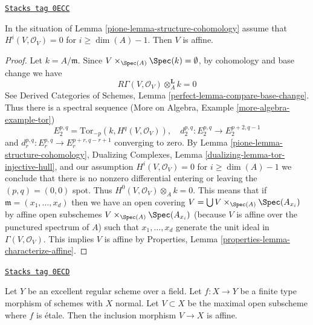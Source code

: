 \begin{lemma}[Conclude]
\label{pione-lemma-conclude}
\href{https://stacks.math.columbia.edu/tag/0ECC}{\texttt{Stacks tag 0ECC}}

In the situation of Lemma \ref{pione-lemma-structure-cohomology}
assume that $H^i(V, \mathcal{O}_V) = 0$ for $i \geq \dim(A) - 1$.
Then $V$ is affine.
\end{lemma}

\begin{proof}

Let $k = A/\mathfrak m$. Since $V \times_{\Spec(A)} \Spec(k) = \emptyset$,
by cohomology and base change we have
$$
R\Gamma(V, \mathcal{O}_V) \otimes_A^\mathbf{L} k = 0
$$
See
Derived Categories of Schemes, Lemma \ref{perfect-lemma-compare-base-change}.
Thus there is a spectral sequence
(More on Algebra, Example \ref{more-algebra-example-tor})
$$
E_2^{p, q} = \text{Tor}_{-p}(k, H^q(V, \mathcal{O}_V)),\quad
d_2^{p, q} : E_2^{p, q} \to E_2^{p + 2, q - 1}
$$
and $d_r^{p, q} : E_r^{p, q} \to E_r^{p + r, q - r + 1}$
converging to zero. By Lemma \ref{pione-lemma-structure-cohomology},
Dualizing Complexes, Lemma \ref{dualizing-lemma-tor-injective-hull},
and our assumption $H^i(V, \mathcal{O}_V) = 0$ for $i \geq \dim(A) - 1$
we conclude that there is no nonzero differential
entering or leaving the $(p, q) = (0, 0)$ spot. Thus
$H^0(V, \mathcal{O}_V) \otimes_A k = 0$. This means that
if $\mathfrak m = (x_1, \ldots, x_d)$ then we have
an open covering $V = \bigcup V \times_{\Spec(A)} \Spec(A_{x_i})$
by affine open subschemes $V \times_{\Spec(A)} \Spec(A_{x_i})$
(because $V$ is affine over the punctured spectrum of $A$)
such that $x_1, \ldots, x_d$ generate
the unit ideal in $\Gamma(V, \mathcal{O}_V)$.
This implies $V$ is affine by
Properties, Lemma \ref{properties-lemma-characterize-affine}.
\end{proof}

\begin{theorem}[Global]
\label{pione-theorem-global}
\href{https://stacks.math.columbia.edu/tag/0ECD}{\texttt{Stacks tag 0ECD}}

Let $Y$ be an excellent regular scheme over a field. Let $f : X \to Y$
be a finite type morphism of schemes with $X$ normal. Let $V \subset X$
be the maximal open subscheme where $f$ is \'etale. Then the inclusion
morphism $V \to X$ is affine.
\end{theorem}

